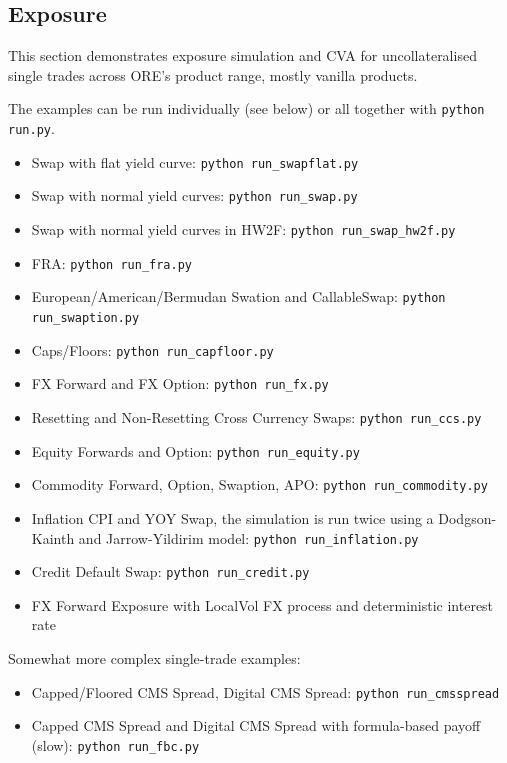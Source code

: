 \subsection{Exposure}\label{example:exposure}

This section demonstrates exposure simulation and CVA for uncollateralised single trades across ORE's product range, mostly vanilla products.

The examples can be run individually (see below) or all together with {\tt python run.py}.

\begin{itemize}
\item Swap with flat yield curve: {\tt python run\_swapflat.py}
\item Swap with normal yield curves: {\tt python run\_swap.py}
\item Swap with normal yield curves in HW2F: {\tt python run\_swap\_hw2f.py}
\item FRA: {\tt python run\_fra.py}
\item European/American/Bermudan Swation and CallableSwap: {\tt python run\_swaption.py}
\item Caps/Floors: {\tt python run\_capfloor.py}
\item FX Forward and FX Option: {\tt python run\_fx.py}
\item Resetting and Non-Resetting Cross Currency Swaps: {\tt python run\_ccs.py}
\item Equity Forwards and Option: {\tt python run\_equity.py}
\item Commodity Forward, Option, Swaption, APO: {\tt python run\_commodity.py}
\item Inflation CPI and YOY Swap, the simulation is run twice using a Dodgson-Kainth and Jarrow-Yildirim model: {\tt python run\_inflation.py}
\item Credit Default Swap: {\tt python run\_credit.py}
\item FX Forward Exposure with LocalVol FX process and deterministic interest rate
\end{itemize}

Somewhat more complex single-trade examples:
\begin{itemize}
\item Capped/Floored CMS Spread, Digital CMS Spread: {\tt python run\_cmsspread}
\item Capped CMS Spread and Digital CMS Spread with formula-based payoff (slow): {\tt python run\_fbc.py}
\end{itemize}

